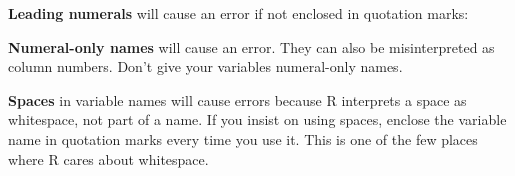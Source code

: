\documentclass[
  13,
  letterpaper,
]{report}
\newenvironment{Shaded}{\begin{snugshade}}{\end{snugshade}}
\newcommand{\CommentTok}[1]{\textcolor[rgb]{0.37,0.37,0.37}{#1}}
\newcommand{\DecValTok}[1]{\textcolor[rgb]{0.68,0.00,0.00}{#1}}
\newcommand{\FunctionTok}[1]{\textcolor[rgb]{0.28,0.35,0.67}{#1}}
\newcommand{\NormalTok}[1]{\textcolor[rgb]{0.00,0.23,0.31}{#1}}
\newcommand{\OtherTok}[1]{\textcolor[rgb]{0.00,0.23,0.31}{#1}}
\newcommand{\SpecialCharTok}[1]{\textcolor[rgb]{0.37,0.37,0.37}{#1}}
\newcommand{\StringTok}[1]{\textcolor[rgb]{0.13,0.47,0.30}{#1}}
\begin{document}
\textbf{Leading numerals} will cause an error if not enclosed in
quotation marks:

\begin{Shaded}
\end{Shaded}

\textbf{Numeral-only names} will cause an error. They can also be
misinterpreted as column numbers. Don't give your variables numeral-only
names.

\begin{Shaded}
\end{Shaded}

\textbf{Spaces} in variable names will cause errors because R interprets
a space as whitespace, not part of a name. If you insist on using
spaces, enclose the variable name in quotation marks every time you use
it. This is one of the few places where R cares about whitespace.

\begin{Shaded}
\end{Shaded}
\end{document}
